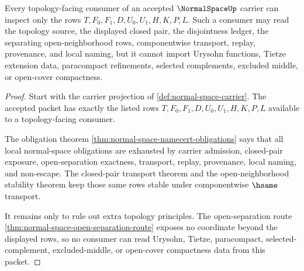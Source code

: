 \begin{theorem}
\label{thm:normal-space-topology-consumer-boundary}
Every topology-facing consumer of an accepted $\NormalSpaceUp$ carrier can inspect only the rows $T,F_0,F_1,D,U_0,U_1,H,K,P,L$. Such a consumer may read the topology source, the displayed closed pair, the disjointness ledger, the separating open-neighborhood rows, componentwise transport, replay, provenance, and local naming, but it cannot import Urysohn functions, Tietze extension data, paracompact refinements, selected complements, excluded middle, or open-cover compactness.
\end{theorem}
\begin{proof}
Start with the carrier projection of \autoref{def:normal-space-carrier}. The accepted packet has exactly the listed rows $T,F_0,F_1,D,U_0,U_1,H,K,P,L$ available to a topology-facing consumer.

The obligation theorem \autoref{thm:normal-space-namecert-obligations} says that all local normal-space obligations are exhausted by carrier admission, closed-pair exposure, open-separation exactness, transport, replay, provenance, local naming, and non-escape. The closed-pair transport theorem and the open-neighborhood stability theorem keep those same rows stable under componentwise $\hsame$ transport.

It remains only to rule out extra topology principles. The open-separation route \autoref{thm:normal-space-open-separation-route} exposes no coordinate beyond the displayed rows, so no consumer can read Urysohn, Tietze, paracompact, selected-complement, excluded-middle, or open-cover compactness data from this packet.
\end{proof}

